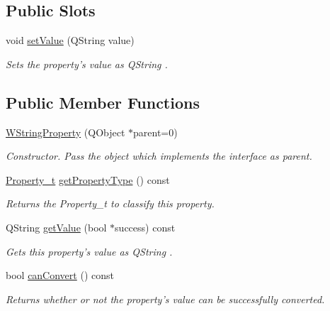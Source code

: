 \subsection*{Public Slots}
\begin{DoxyCompactItemize}
\item 
void \hyperlink{class_w_string_property_a009c775b69f7365fac0e301ce7d88d2b}{set\-Value} (Q\-String value)
\begin{DoxyCompactList}\small\item\em Sets the property's value as Q\-String . \end{DoxyCompactList}\end{DoxyCompactItemize}
\subsection*{Public Member Functions}
\begin{DoxyCompactItemize}
\item 
\hyperlink{class_w_string_property_a228ffc3c7c49e3964e0ed7d59d4e30dd}{W\-String\-Property} (Q\-Object $\ast$parent=0)
\begin{DoxyCompactList}\small\item\em Constructor. Pass the object which implements the interface as parent. \end{DoxyCompactList}\item 
\hyperlink{group___property_classes_ga38f1ccddda12c7cb50b868c9f789ee37}{Property\-\_\-t} \hyperlink{class_w_string_property_a33a58ae5da7f4e483101ea048b254700}{get\-Property\-Type} () const 
\begin{DoxyCompactList}\small\item\em Returns the Property\-\_\-t to classify this property. \end{DoxyCompactList}\item 
Q\-String \hyperlink{class_w_string_property_a4f31475a4b8cd8f7958bbfdaba6cca42}{get\-Value} (bool $\ast$success) const 
\begin{DoxyCompactList}\small\item\em Gets this property's value as Q\-String . \end{DoxyCompactList}\item 
bool \hyperlink{class_w_string_property_a6b52241cfefcea196a347bc90f57dc25}{can\-Convert} () const 
\begin{DoxyCompactList}\small\item\em Returns whether or not the property's value can be successfully converted. \end{DoxyCompactList}\end{DoxyCompactItemize}
